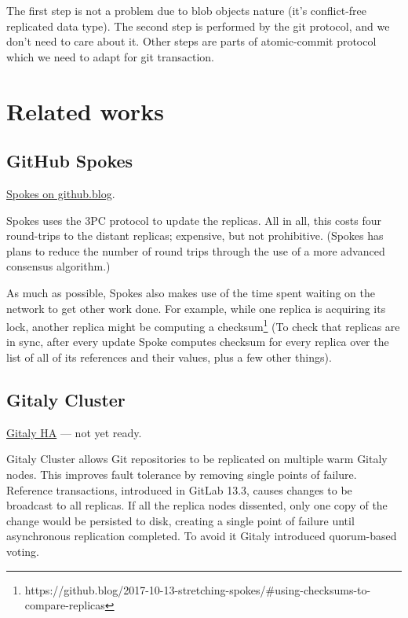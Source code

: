 \documentclass[sigplan, screen, nonacm, 11pt]{acmart}
\begin{document}
The first step is not a problem due to blob objects nature (it's conflict-free replicated data type).
The second step is performed by the git protocol, and we don't need to care about it.
Other steps are parts of atomic-commit protocol which we need to adapt for git transaction.

\section{Related works}

\subsection{GitHub Spokes}

\href{https://github.blog/2017-10-13-stretching-spokes/}{Spokes on github.blog}.

Spokes uses the 3PC protocol to update the replicas.
All in all, this costs four round-trips to the distant replicas;
expensive, but not prohibitive.
(Spokes has plans to reduce the number of round trips through the use of a more advanced consensus algorithm.)

As much as possible, Spokes also makes use of the time spent waiting on the network to get other work done.
For example, while one replica is acquiring its lock,
another replica might be computing a checksum\footnote{https://github.blog/2017-10-13-stretching-spokes/\#using-checksums-to-compare-replicas} (To check that replicas are in sync, after every update Spoke computes checksum for every replica over the list of all of its references and their values, plus a few other things).





\subsection{Gitaly Cluster}

\href{https://gitlab.com/groups/gitlab-org/-/epics/1189}{Gitaly HA} --- not yet ready.

Gitaly Cluster allows Git repositories to be replicated on multiple warm Gitaly nodes.
This improves fault tolerance by removing single points of failure.
Reference transactions, introduced in GitLab 13.3,
causes changes to be broadcast to all replicas.
If all the replica nodes dissented, only one copy of the change would be persisted to disk,
creating a single point of failure until asynchronous replication completed.
To avoid it Gitaly introduced quorum-based voting.
\end{document}
